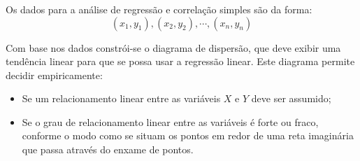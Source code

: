 \documentclass[14pt,aspectratio=1610]{beamer}
\begin{document}
\begin{frame}{}
\frametitle{ }
\begin{block}{}
\justifying
Os dados para a análise de regressão e correlação simples são da forma:
$$(x_{1},y_{1}),(x_{2},y_{2}),\cdots, (x_{n},y_{n})$$

Com base nos dados constrói-se o diagrama de dispersão, que deve exibir
uma tendência linear para que se possa usar a regressão linear.
Este diagrama permite decidir empiricamente:
\begin{itemize}
\item Se um relacionamento linear entre as variáveis $X$ e $Y$ deve ser assumido;
\item Se o grau de relacionamento linear entre as variáveis é forte ou fraco,
conforme o modo como se situam os pontos em redor de uma reta imaginária que passa através do enxame de pontos.
\end{itemize}
\end{block}
\end{frame}
\end{document}

